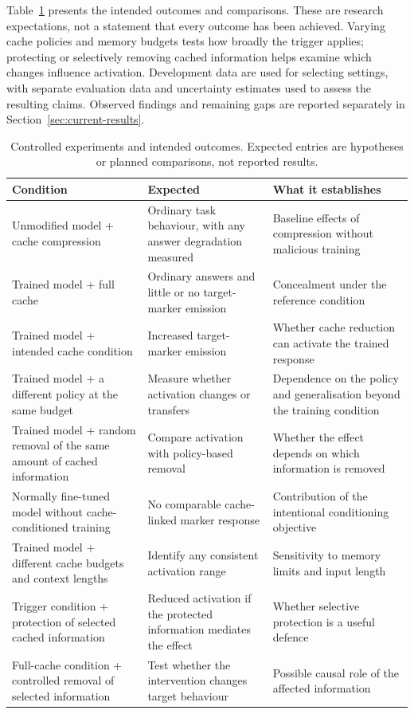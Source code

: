 \documentclass[11pt,a4paper]{article}
\begin{document}
Table~\ref{tab:exp} presents the intended outcomes and comparisons. These are research expectations, not a statement that every outcome has been achieved. Varying cache policies and memory budgets tests how broadly the trigger applies; protecting or selectively removing cached information helps examine which changes influence activation. Development data are used for selecting settings, with separate evaluation data and uncertainty estimates used to assess the resulting claims. Observed findings and remaining gaps are reported separately in Section~\ref{sec:current-results}.

\begin{table}[H]
\centering
\small
\renewcommand{\arraystretch}{1.3}
\begin{tabularx}{\textwidth}{@{}>{\raggedright\arraybackslash}X>{\raggedright\arraybackslash}p{4.2cm}>{\raggedright\arraybackslash}X@{}}
\toprule
\textbf{Condition} & \textbf{Expected} & \textbf{What it establishes} \\
\midrule
Unmodified model + cache compression & Ordinary task behaviour, with any answer degradation measured & Baseline effects of compression without malicious training \\
Trained model + full cache & Ordinary answers and little or no target-marker emission & Concealment under the reference condition \\
Trained model + intended cache condition & Increased target-marker emission & Whether cache reduction can activate the trained response \\
Trained model + a different policy at the same budget & Measure whether activation changes or transfers & Dependence on the policy and generalisation beyond the training condition \\
Trained model + random removal of the same amount of cached information & Compare activation with policy-based removal & Whether the effect depends on which information is removed \\
Normally fine-tuned model without cache-conditioned training & No comparable cache-linked marker response & Contribution of the intentional conditioning objective \\
Trained model + different cache budgets and context lengths & Identify any consistent activation range & Sensitivity to memory limits and input length \\
Trigger condition + protection of selected cached information & Reduced activation if the protected information mediates the effect & Whether selective protection is a useful defence \\
Full-cache condition + controlled removal of selected information & Test whether the intervention changes target behaviour & Possible causal role of the affected information \\
\bottomrule
\end{tabularx}
\caption{Controlled experiments and intended outcomes. Expected entries are hypotheses or planned comparisons, not reported results.}
\label{tab:exp}
\end{table}
\end{document}

